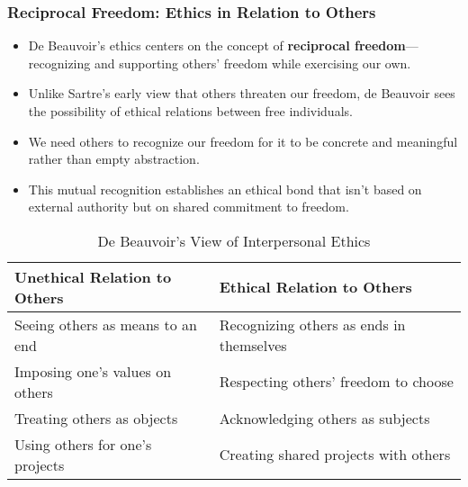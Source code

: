 \documentclass[aspectratio=169]{beamer}
\begin{document}
		\begin{frame}
			\frametitle{Reciprocal Freedom: Ethics in Relation to Others}
			\begin{itemize}
				\item De Beauvoir's ethics centers on the concept of \textbf{reciprocal freedom}—recognizing and supporting others' freedom while exercising our own.
				\item Unlike Sartre's early view that others threaten our freedom, de Beauvoir sees the possibility of ethical relations between free individuals.
				\item We need others to recognize our freedom for it to be concrete and meaningful rather than empty abstraction.
				\item This mutual recognition establishes an ethical bond that isn't based on external authority but on shared commitment to freedom.
			\end{itemize}
			
			\begin{table}
				\begin{tabular}{|p{6cm}|p{6cm}|}
					\hline
					\textbf{Unethical Relation to Others} & \textbf{Ethical Relation to Others} \\
					\hline
					Seeing others as means to an end & Recognizing others as ends in themselves \\
					Imposing one's values on others & Respecting others' freedom to choose \\
					Treating others as objects & Acknowledging others as subjects \\
					Using others for one's projects & Creating shared projects with others \\
					\hline
				\end{tabular}
				\caption{De Beauvoir's View of Interpersonal Ethics}
			\end{table}
		\end{frame}
		
\end{document}

